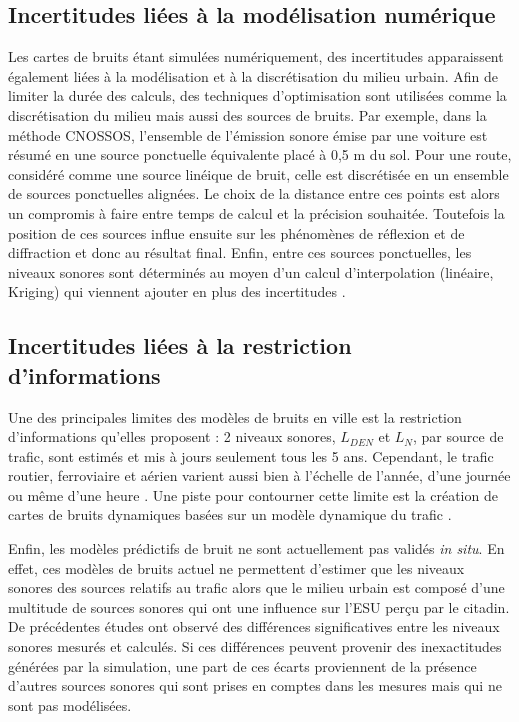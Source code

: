 \subsection{Incertitudes liées à la modélisation numérique}

Les cartes de bruits étant simulées numériquement, des incertitudes apparaissent également liées à la modélisation et à la discrétisation du milieu urbain. Afin de limiter la durée des calculs, des techniques d'optimisation sont utilisées comme la discrétisation du milieu mais aussi des sources de bruits. Par exemple, dans la méthode CNOSSOS, l'ensemble de l'émission sonore émise par une voiture est résumé en une source ponctuelle équivalente placé à 0,5 m du sol. Pour une route, considéré comme une source linéique de bruit, celle est discrétisée en un ensemble de sources ponctuelles alignées. Le choix de la distance entre ces points est alors un compromis à faire entre temps de calcul et la précision souhaitée. Toutefois la position de ces sources influe ensuite sur les phénomènes de réflexion et de diffraction et donc au résultat final. Enfin, entre ces sources ponctuelles, les niveaux sonores sont déterminés au moyen d'un calcul d'interpolation (linéaire, Kriging) qui viennent ajouter en plus des incertitudes \cite{van_leeuwen_noise_2015}. 

\subsection{Incertitudes liées à la restriction d'informations}

Une des principales limites des modèles de bruits en ville est la restriction d'informations qu'elles proposent : 2 niveaux sonores, $L_{DEN}$ et $L_N$, par source de trafic, sont estimés et mis à jours seulement tous les 5 ans. Cependant, le trafic routier, ferroviaire et aérien varient aussi bien à l'échelle de l'année, d'une journée ou même d'une heure \cite{lv2015traffic}. Une piste pour contourner cette limite est la création de cartes de bruits dynamiques basées sur un modèle dynamique du trafic \cite{can2010traffic}. 

Enfin, les modèles prédictifs de bruit ne sont actuellement pas validés \textit{in situ}. En effet, ces modèles de bruits actuel ne permettent d'estimer que les niveaux sonores des sources relatifs au trafic alors que le milieu urbain est composé d'une multitude de sources sonores qui ont une influence sur l'ESU perçu par le citadin. De précédentes études \cite{Mioduszewski, zannin_characterization_2013} ont observé des différences significatives entre les niveaux sonores mesurés et calculés. Si ces différences peuvent provenir des inexactitudes générées par la simulation, une part de ces écarts proviennent de la présence d'autres sources sonores qui sont prises en comptes dans les mesures mais qui ne sont pas modélisées.\\ 

